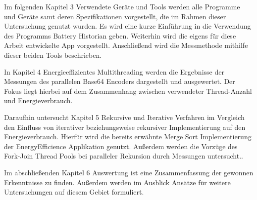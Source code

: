 Im folgenden Kapitel 3 \glqq Verwendete Geräte und Tools\grqq{} werden alle Programme und Geräte samt deren Spezifikationen vorgestellt, die im Rahmen dieser Untersuchung genutzt wurden. Es wird eine kurze Einführung in die Verwendung des Programms Battery Historian geben. Weiterhin wird die eigens für diese Arbeit entwickelte App vorgestellt. Anschließend wird die Messmethode mithilfe dieser beiden Tools beschrieben.

In Kapitel 4 \glqq Energieeffizientes Multithreading\grqq{} werden die Ergebnisse der Messungen des parallelen Base64 Encoders dargestellt und ausgewertet. Der Fokus liegt hierbei auf dem Zusammenhang zwischen verwendeter Thread-Anzahl und Energieverbrauch.

Daraufhin untersucht Kapitel 5 \glqq Rekursive und Iterative Verfahren im Vergleich\grqq{} den Einfluss von iterativer beziehungsweise rekursiver Implementierung auf den Energieverbrauch. Hierfür wird die bereits erwähnte Merge Sort Implementierung der \glqq EnergyEfficience\grqq{} Applikation genutzt. Außerdem werden die Vorzüge des Fork-Join Thread Pools bei paralleler Rekursion durch Messungen untersucht..

Im abschließenden Kapitel 6 \glqq Auswertung\grqq{} ist eine Zusammenfassung der gewonnen Erkenntnisse zu finden. Außerdem werden im Ausblick Ansätze für weitere Untersuchungen auf diesem Gebiet formuliert.


